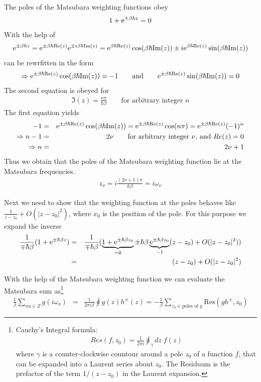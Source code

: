 \documentclass[11pt,a4paper]{report}
\begin{document}
The poles of the Matsubara weighting functions obey
\begin{eqnarray}
1+\mathrm{e}^{\pm\beta\hbar z}=0
\label{eq:matsubarapolecond}
\end{eqnarray}
With the help of
\begin{eqnarray*}
\mathrm{e}^{\pm\beta\hbar z}
=\mathrm{e}^{\pm\beta\hbar\mathrm{Re}(z)}\mathrm{e}^{\pm i\beta\hbar\mathrm{Im}(z)}
=\mathrm{e}^{\beta\hbar\mathrm{Re}(z)}\cos(\beta\hbar\mathrm{Im}(z))
\pm i\mathrm{e}^{\beta\hbar\mathrm{Re}(z)}\sin(\beta\hbar\mathrm{Im}(z))
\end{eqnarray*}
 can be rewrfitten in the form
\begin{eqnarray}
\Rightarrow
\mathrm{e}^{\pm \beta\hbar\mathrm{Re}(z)}\cos(\beta\hbar\mathrm{Im}(z))=-1
\qquad\text{and}\qquad
\mathrm{e}^{\pm \beta\hbar\mathrm{Re}(z)}\sin(\beta\hbar\mathrm{Im}(z))=0
\end{eqnarray}
The second equation is obeyed for
\begin{eqnarray}
\Im(z)=\frac{n\pi}{\hbar\beta}\qquad\text{for arbitrary integer $n$}
\end{eqnarray}
The first equation yields
\begin{eqnarray}
-1&=&\mathrm{e}^{\pm\beta\hbar\mathrm{Re}(z)}\cos(\beta\hbar\mathrm{Im}(z))
=\mathrm{e}^{\pm\beta\hbar\mathrm{Re}(z)}\cos(n\pi)
=\mathrm{e}^{\pm\beta\hbar\mathrm{Re}(z)}(-1)^n
\nonumber\\
\Rightarrow
n-1&=&2\nu \qquad\text{for arbitrary integer $\nu$, and $Re(z)=0$}
\nonumber\\
\Rightarrow
n&=&2\nu+1
\end{eqnarray}
Thus we obtain that the poles of the Matsubara weighting function lie
at the Matsubara frequencies.
\begin{eqnarray}
z_\nu=i\frac{(2\nu+1)\pi}{\hbar\beta}=i\omega_\nu
\end{eqnarray}

Next we need to show that the weighting function at the poles behaves
like $\frac{1}{z-z_0}+O(|z-z_0|^2)$, where $x_0$ is the position of the pole.
For this purpose we expand the inverse
\begin{eqnarray}
\frac{1}{\mp\hbar\beta}(1+\mathrm{e}^{\pm\hbar\beta z})
&=&\frac{1}{\mp\hbar\beta}
(\underbrace{1+\mathrm{e}^{\pm\hbar\beta z_0}}_{=0} 
\pm\hbar\beta\underbrace{\mathrm{e}^{\pm\hbar\beta z_0}}_{-1}(z-z_0)+O(|z-z_0|^2) )
\\
&=&(z-z_0)+O(|z-z_0|^2) 
\end{eqnarray}



With the help of the Matsubara weighting function we can evaluate the
Matsubara sum as\footnote{Cauchy's Integral formula:
\begin{eqnarray*}
Res(f,z_0)=\frac{1}{2\pi i}\oint_\gamma dz\; f(z)
\end{eqnarray*}
where $\gamma$ is a counter-clockwise countour around a pole $z_0$ of
a function $f$, that can be expanded into a Laurent series about
$z_0$. The Residuum is the prefactor of the term $1/(z-z_0)$ in the
Laurent expansion.}
\begin{eqnarray}
\frac{1}{\beta}\sum_{nu\in Z}g(i\omega_\nu)&=&
\frac{1}{2\pi i\beta}\oint g(z) h^{\pm}(z)
=-\frac{1}{\beta}\sum_{z_0\in\text{poles of g}}
\text{Res}(gh^{\pm},z_0)
\end{eqnarray}
\end{document}
